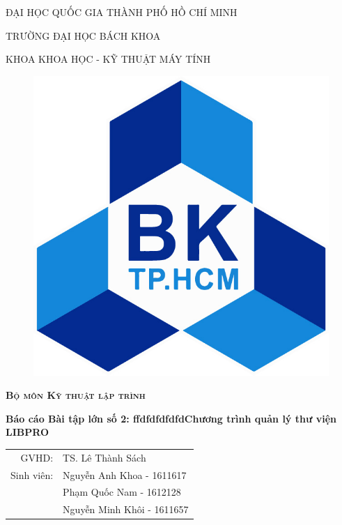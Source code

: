 \documentclass[12pt,a4paper]{report}
\begin{document}
	\begin{titlepage}
		\begin{center}
			{\scshape\large ĐẠI HỌC QUỐC GIA THÀNH PHỐ HỒ CHÍ MINH\par}
					{\scshape\LARGE TRƯỜNG ĐẠI HỌC BÁCH KHOA\par}
			{\scshape\Large KHOA KHOA HỌC - KỸ THUẬT MÁY TÍNH}
			\vspace{2cm}

		\end{center}
		\begin{figure}[h]
			\centering
			\includegraphics[scale=.2]{LogoBK.jpg}
		\end{figure}
		\vspace{2cm}
		\begin{center}
			{\scshape\LARGE \textbf{Bộ môn Kỹ thuật lập trình}\par}
			\vspace{1cm}
			\Large \textbf{Báo cáo Bài tập lớn số 2: ffdfdfdfdfdChương trình quản lý thư viện LIBPRO}
		\end{center}
		\vspace{2cm}
		\begin{center}
			\begin{tabular}{r l}
				GVHD:&TS. Lê Thành Sách\\
				Sinh viên:&Nguyễn Anh Khoa - 1611617\\
				&Phạm Quốc Nam - 1612128\\
				&Nguyễn Minh Khôi - 1611657\\
			\end{tabular}\\
		\end{center}
	\end{titlepage}
\newpage
\end{document}
